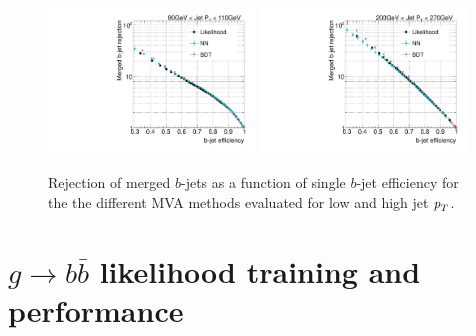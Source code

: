 
\begin{figure}[tp]
\centering
\includegraphics[width=0.49\textwidth]{FIGS/TEMPFigs/MVA_differentMethods/bins/MVAs_RejvsEff80.pdf}
\includegraphics[width=0.49\textwidth]{FIGS/TEMPFigs/MVA_differentMethods/bins/MVAs_RejvsEff200.pdf}
\caption{Rejection of merged $b$-jets as a function of single $b$-jet efficiency for the the different MVA methods evaluated for low and high jet ${\emph{p}_{T}}$.}
\label{fig:diffmethodsPerfBins}
\end{figure}



\section{$g\rightarrow b\bar{b}$ likelihood training and performance}

